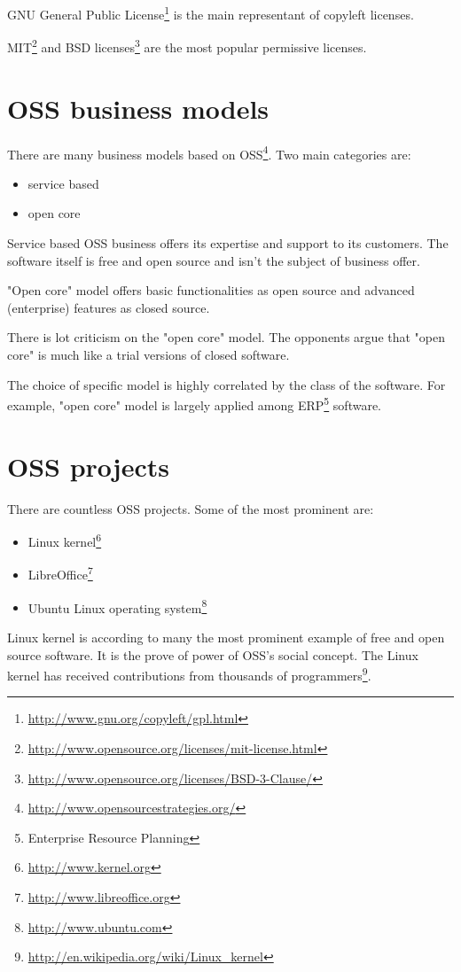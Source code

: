 \documentclass[times, utf8, seminar]{fit}
\begin{document}
GNU General Public License\footnote{\url{http://www.gnu.org/copyleft/gpl.html}} is the main representant of copyleft licenses.

MIT\footnote{\url{http://www.opensource.org/licenses/mit-license.html}} and BSD licenses\footnote{\url{http://www.opensource.org/licenses/BSD-3-Clause/}} are the most popular permissive licenses.

\section{OSS business models}

There are many business models based on OSS\footnote{\url{http://www.opensourcestrategies.org/}}. Two main categories are: 
\begin{itemize}
  \item service based
  \item open core
\end{itemize}

Service based OSS business offers its expertise and support to its customers. The software itself is free and open source and isn't the subject of business offer.

"Open core" model offers basic functionalities as open source and advanced (enterprise) features as closed source.

There is lot criticism on the "open core" model. The opponents argue that "open core" is much like a trial versions of closed software.

The choice of specific model is highly correlated by the class of the software.  For example, "open core" model is largely applied among ERP\footnote{Enterprise Resource Planning} software.  

\section{OSS projects}

There are countless OSS projects. Some of the most prominent are:  
\begin{itemize}
  \item Linux kernel\footnote{\url{http://www.kernel.org}}
  \item LibreOffice\footnote{\url{http://www.libreoffice.org}}
  \item Ubuntu Linux operating system\footnote{\url{http://www.ubuntu.com}}
\end{itemize}

Linux kernel is according to many the most prominent example of free and open source software. It is the prove of power of OSS's social concept. The Linux kernel has received contributions from thousands of programmers\footnote{\url{http://en.wikipedia.org/wiki/Linux_kernel}}.
\end{document}
